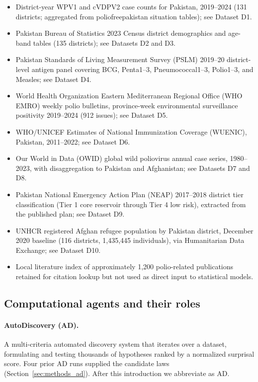\documentclass[11pt]{article}
\begin{document}
\begin{itemize}[noitemsep]
\item District-year WPV1 and cVDPV2 case counts for Pakistan, 2019--2024 (131 districts; aggregated from poliofreepakistan situation tables); see Dataset D1.
\item Pakistan Bureau of Statistics 2023 Census district demographics and age-band tables (135 districts); see Datasets D2 and D3.
\item Pakistan Standards of Living Measurement Survey (PSLM) 2019--20 district-level antigen panel covering BCG, Penta1--3, Pneumococcal1--3, Polio1--3, and Measles; see Dataset D4.
\item World Health Organization Eastern Mediterranean Regional Office (WHO EMRO) weekly polio bulletins, province-week environmental surveillance positivity 2019--2024 (912 issues); see Dataset D5.
\item WHO/UNICEF Estimates of National Immunization Coverage (WUENIC), Pakistan, 2011--2022; see Dataset D6.
\item Our World in Data (OWID) global wild poliovirus annual case series, 1980--2023, with disaggregation to Pakistan and Afghanistan; see Datasets D7 and D8.
\item Pakistan National Emergency Action Plan (NEAP) 2017--2018 district tier classification (Tier 1 core reservoir through Tier 4 low risk), extracted from the published plan; see Dataset D9.
\item UNHCR registered Afghan refugee population by Pakistan district, December 2020 baseline (116 districts, 1{,}435{,}445 individuals), via Humanitarian Data Exchange; see Dataset D10.
\item Local literature index of approximately 1{,}200 polio-related publications retained for citation lookup but not used as direct input to statistical models.
\end{itemize}

\subsection{Computational agents and their roles}

\paragraph{AutoDiscovery (AD).} A multi-criteria automated discovery system that iterates over a dataset, formulating and testing thousands of hypotheses ranked by a normalized surprisal score. Four prior AD runs supplied the candidate laws (Section~\ref{sec:methods_ad}). After this introduction we abbreviate as AD.
\end{document}
